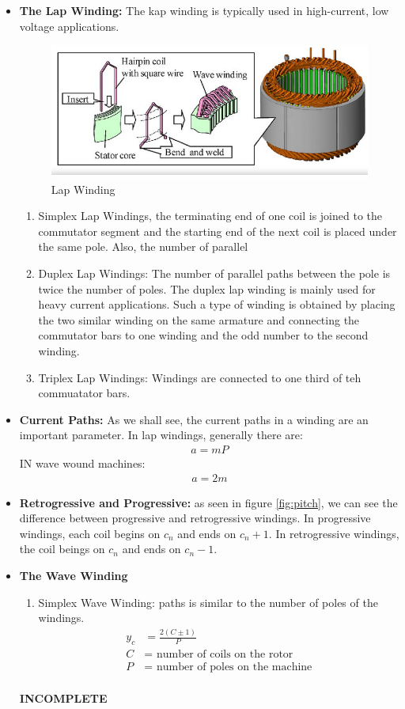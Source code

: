 \documentclass{book}
\begin{document}
\begin{itemize}
	\item \textbf{The Lap Winding:} The kap winding is typically used in high-current, low voltage applications.
	 \begin{figure}[h]
		\centering
		\includegraphics[width=0.4\linewidth]{Screenshots/lap_winding}
		\caption{Lap Winding}
		\label{fig:lapwinding}
	\end{figure}
	\begin{enumerate}
		\item Simplex Lap Windings, the terminating end of one coil is joined to the commutator segment and the starting end of the next coil is placed under the same pole. Also, the number of parallel 
		\item Duplex Lap Windings: The number of parallel paths between the pole is twice the number of poles. The duplex lap winding is mainly used for heavy current applications. Such a type of winding is obtained by placing the two similar winding on the same armature and connecting the commutator bars to one winding and the odd number to the second winding.
		\item Triplex Lap Windings: Windings are connected to one third of teh commuatator bars.
	\end{enumerate}
	\item \textbf{Current Paths:} As we shall see, the current paths in a winding are an important parameter. In lap windings, generally there are:
	\begin{align*}
		a= mP
	\end{align*}
	IN wave wound machines:
	\begin{align*}
		a = 2m
	\end{align*}
	\item \textbf{Retrogressive and Progressive:} as seen in figure \ref{fig:pitch}, we can see the difference between progressive and retrogressive windings. In progressive windings, each coil begins on $c_n$ and ends on $c_n+1$. In retrogressive windings, the coil beings on $c_n$ and ends on $c_n -1$.
	
	\item \textbf{The Wave Winding}
	\begin{enumerate}
		\item Simplex Wave Winding:
		paths is similar to the number of poles of the windings.
		\begin{align*}
			y_c &= \frac{2(C\pm 1)}{P} \\
			C&= \text{ number of coils on the rotor} \\
			P&= \text{ number of poles on the machine} \\ 
		\end{align*}
	\end{enumerate}
	\textbf{INCOMPLETE}
\end{itemize}
\end{document}
